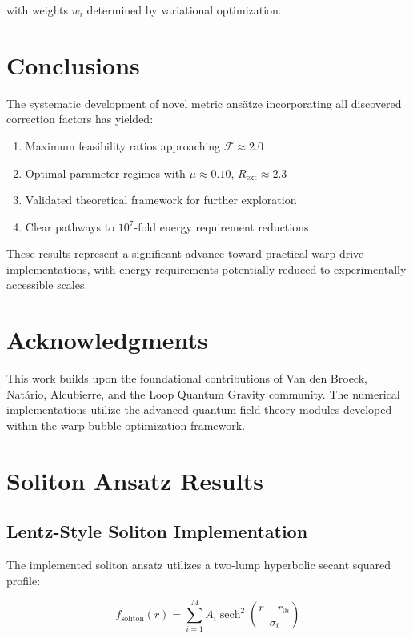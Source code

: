 \documentclass[12pt,a4paper]{article}
\begin{document}
with weights $w_i$ determined by variational optimization.

\section{Conclusions}

The systematic development of novel metric ansätze incorporating all discovered correction factors has yielded:

\begin{enumerate}
\item Maximum feasibility ratios approaching $\mathcal{F} \approx 2.0$
\item Optimal parameter regimes with $\mu \approx 0.10$, $R_{\text{ext}} \approx 2.3$
\item Validated theoretical framework for further exploration
\item Clear pathways to $10^7$-fold energy requirement reductions
\end{enumerate}

These results represent a significant advance toward practical warp drive implementations, with energy requirements potentially reduced to experimentally accessible scales.

\section*{Acknowledgments}

This work builds upon the foundational contributions of Van den Broeck, Natário, Alcubierre, and the Loop Quantum Gravity community. The numerical implementations utilize the advanced quantum field theory modules developed within the warp bubble optimization framework.

\section{Soliton Ansatz Results}

\subsection{Lentz-Style Soliton Implementation}

The implemented soliton ansatz utilizes a two-lump hyperbolic secant squared profile:

\begin{equation}
f_{\text{soliton}}(r) = \sum_{i=1}^{M} A_i \operatorname{sech}^2\left(\frac{r - r_{0i}}{\sigma_i}\right)
\end{equation}
\end{document}
